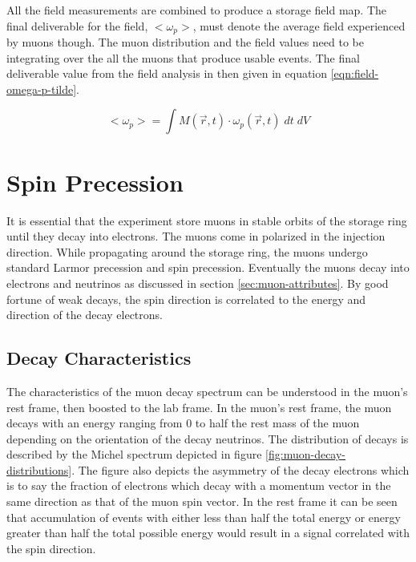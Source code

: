 All the field measurements are combined to produce a storage field map.  The final deliverable for the field, $<\omega_p>$, must denote the average field experienced by muons though.  The muon distribution and the field values need to be integrating over the all the muons that produce usable events.  The final deliverable value from the field analysis in then given in equation \ref{eqn:field-omega-p-tilde}.

\begin{equation}
\label{eqn:field-omega-p-tilde}
<\omega_p> = \int M(\vec{r}, t) \cdot \omega_p(\vec{r}, t)\; dt\;dV
\end{equation}


\section{Spin Precession} \label{sec:spin-precession}

It is essential that the experiment store muons in stable orbits of the storage ring until they decay into electrons.  The muons come in polarized in the injection direction.  While propagating around the storage ring, the muons undergo standard Larmor precession and spin precession.  Eventually the muons decay into electrons and neutrinos as discussed in section \ref{sec:muon-attributes}. By good fortune of weak decays, the spin direction is correlated to the energy and direction of the decay electrons.

\subsection{Decay Characteristics}

The characteristics of the muon decay spectrum can be understood in the muon's rest frame, then boosted to the lab frame.  In the muon's rest frame, the muon decays with an energy ranging from 0 to half the rest mass of the muon depending on the orientation of the decay neutrinos.  The distribution of decays is described by the Michel spectrum depicted in figure \ref{fig:muon-decay-distributions}.  The figure also depicts the asymmetry of the decay electrons which is to say the fraction of electrons which decay with a momentum vector in the same direction as that of the muon spin vector.  In the rest frame it can be seen that accumulation of events with either less than half the total energy or energy greater than half the total possible energy would result in a signal correlated with the spin direction.\cite{e821-prd}

